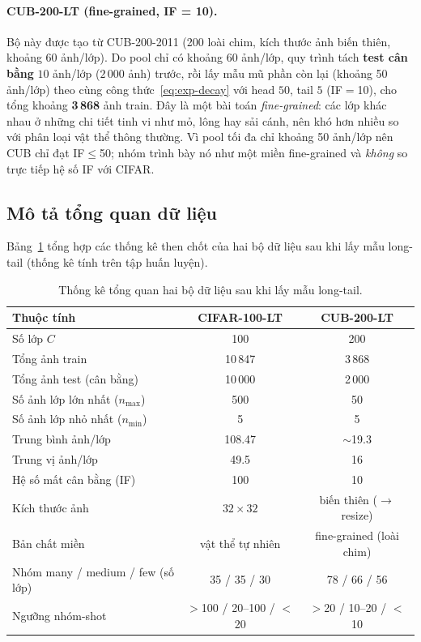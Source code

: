 \paragraph{CUB-200-LT (fine-grained, IF = 10).} Bộ này được tạo từ CUB-200-2011 (200 loài chim, kích
thước ảnh biến thiên, khoảng 60 ảnh/lớp). Do pool chỉ có
khoảng 60 ảnh/lớp, quy trình tách \textbf{test cân bằng} $10$ ảnh/lớp ($2\,000$ ảnh) trước, rồi lấy
mẫu mũ phần còn lại (khoảng 50 ảnh/lớp) theo cùng công thức~\eqref{eq:exp-decay} với head $50$, tail
$5$ (IF$=$10), cho tổng khoảng \textbf{3\,868} ảnh train. Đây là một bài toán \emph{fine-grained}:
các lớp khác nhau ở những chi tiết tinh vi như mỏ, lông hay sải cánh, nên khó hơn nhiều so với phân
loại vật thể thông thường. Vì pool tối đa chỉ khoảng 50 ảnh/lớp nên CUB chỉ đạt IF$\le$50; nhóm
trình bày nó như một miền fine-grained và \emph{không} so trực tiếp hệ số IF với CIFAR.

\subsection{Mô tả tổng quan dữ liệu}

Bảng~\ref{tab:dataset-stats} tổng hợp các thống kê then chốt của hai bộ dữ liệu sau khi lấy mẫu
long-tail (thống kê tính trên tập huấn luyện).

\begin{table}[H]
\centering
\caption{Thống kê tổng quan hai bộ dữ liệu sau khi lấy mẫu long-tail.}
\label{tab:dataset-stats}
\begin{tabular}{lcc}
\toprule
\textbf{Thuộc tính} & \textbf{CIFAR-100-LT} & \textbf{CUB-200-LT} \\
\midrule
Số lớp $C$ & 100 & 200 \\
Tổng ảnh train & 10\,847 & 3\,868 \\
Tổng ảnh test (cân bằng) & 10\,000 & 2\,000 \\
Số ảnh lớp lớn nhất ($n_{\max}$) & 500 & 50 \\
Số ảnh lớp nhỏ nhất ($n_{\min}$) & 5 & 5 \\
Trung bình ảnh/lớp & 108.47 & $\sim$19.3 \\
Trung vị ảnh/lớp & 49.5 & 16 \\
Hệ số mất cân bằng (IF) & 100 & 10 \\
Kích thước ảnh & $32\times32$ & biến thiên ($\to$ resize) \\
Bản chất miền & vật thể tự nhiên & fine-grained (loài chim) \\
\midrule
Nhóm many / medium / few (số lớp) & 35 / 35 / 30 & 78 / 66 / 56 \\
Ngưỡng nhóm-shot & $>$100 / 20--100 / $<$20 & $>$20 / 10--20 / $<$10 \\
\bottomrule
\end{tabular}
\end{table}

